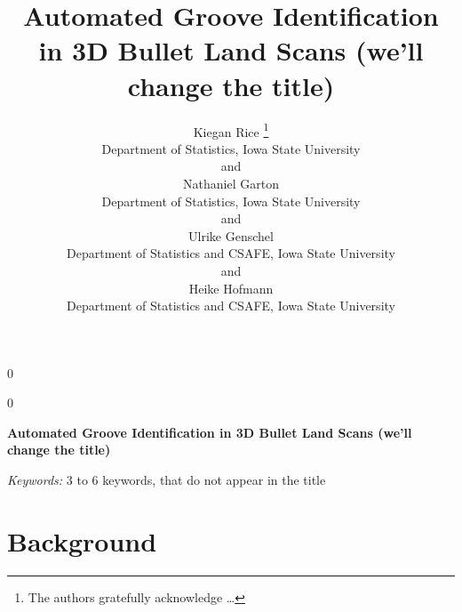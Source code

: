 \documentclass[12pt]{article}
\newcommand{\blind}{0}
\begin{document}
\def\spacingset#1{\renewcommand{\baselinestretch}%
{#1}\small\normalsize} \spacingset{1}




\blind
{
  \title{\bf Automated Groove Identification in 3D Bullet Land Scans (we'll change
the title)}

  \author{
        Kiegan Rice \thanks{The authors gratefully acknowledge \ldots{}} \\
    Department of Statistics, Iowa State University\\
     and \\     Nathaniel Garton \\
    Department of Statistics, Iowa State University\\
     and \\     Ulrike Genschel \\
    Department of Statistics and CSAFE, Iowa State University\\
     and \\     Heike Hofmann \\
    Department of Statistics and CSAFE, Iowa State University\\
      }
  \maketitle
} \fi

\blind
{
  \bigskip
  \bigskip
  \bigskip
  \begin{center}
    {\LARGE\bf Automated Groove Identification in 3D Bullet Land Scans (we'll change
the title)}
  \end{center}
  \medskip
} \fi

\bigskip
\begin{abstract}

\end{abstract}

\noindent%
{\it Keywords:} 3 to 6 keywords, that do not appear in the title
\vfill

\newpage
\spacingset{1.45} %

\newcommand{\hh}[1]{{\color{orange}{#1}}}
\newcommand{\kr}[1]{{\color{teal}{#1}}}
\newcommand{\ug}[1]{{\color{purple}{#1}}}
\newcommand{\nate}[1]{{\color{olive}{#1}}}




\section{Background}
\end{document}
